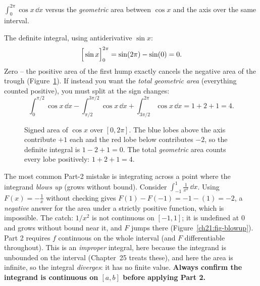 \begin{example}\label{ch21:ex-signed}
$\displaystyle \int_0^{2\pi}\cos x\,\dd x$ versus the \emph{geometric} area
between $\cos x$ and the axis over the same interval.

The definite integral, using antiderivative $\sin x$:
\[
  \Big[\sin x\Big]_{0}^{2\pi} = \sin(2\pi)-\sin(0) = 0 .
\]
Zero -- the positive area of the first hump exactly cancels the negative area of
the trough (Figure~\ref{ch21:fig-signed}). If instead you want the \emph{total
geometric area} (everything counted positive), you must split at the sign
changes:
\[
  \int_0^{\pi/2}\!\cos x\,\dd x - \int_{\pi/2}^{3\pi/2}\!\cos x\,\dd x
  + \int_{3\pi/2}^{2\pi}\!\cos x\,\dd x
  = 1 + 2 + 1 = 4 .
\]

\begin{figure}[H]
\centering
{}
\caption{Signed area of $\cos x$ over $[0,2\pi]$. The blue lobes above the axis
contribute $+1$ each and the red lobe below contributes $-2$, so the definite
integral is $1-2+1=0$. The total \emph{geometric} area counts every lobe
positively: $1+2+1=4$.}
\label{ch21:fig-signed}
\end{figure}
\end{example}

\begin{trapbox}
The most common Part-2 mistake is integrating across a point where the
integrand \emph{blows up} (grows without bound). Consider
$\int_{-1}^{1}\frac{1}{x^2}\,\dd x$. Using $F(x)=-\tfrac1x$ without checking gives
$F(1)-F(-1)=-1-(1)=-2$, a \emph{negative} answer for the area under a strictly
positive function, which is impossible. The catch: $1/x^2$
is not continuous on $[-1,1]$; it is undefined at $0$ and grows without bound
near it, and $F$ jumps there (Figure~\ref{ch21:fig-blowup}). Part 2 requires $f$
continuous on the whole interval (and $F$ differentiable throughout). This is an
\emph{improper} integral, here because the integrand is unbounded on the
interval (Chapter~25 treats these), and here the area is infinite, so the integral
\emph{diverges}: it has no finite value. \textbf{Always confirm the integrand is
continuous on $[a,b]$ before applying Part 2.}
\end{trapbox}

